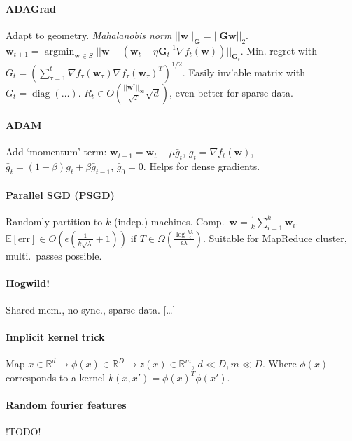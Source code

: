 \documentclass[9pt]{scrartcl}
\DeclareMathOperator{\diag}{diag}
\DeclareMathOperator{\argmin}{argmin}
\newcommand{\eps}{\epsilon}
\newcommand{\R}{\mathbb{R}}
\newcommand{\E}{\mathbb{E}}
\begin{document}
\begin{twocolumn}
\paragraph{ADAGrad}
Adapt to geometry.
\emph{Mahalanobis norm} $||\bm w||_{\bm G} = ||\bm G\bm w||_2$. \\
$\bm w_{t+1}=\argmin_{\bm w\in S}||\bm w - (\bm w_t - \eta \bm G_t^{-1}\nabla f_t(\bm w))||_{\bm G_t}$.
Min. regret with $G_t = (\sum_{\tau = 1}^{t} \nabla f_\tau(\bm w_\tau)\nabla f_\tau(\bm w_\tau)^T)^{1/2}.$
Easily inv'able matrix with $G_t = \diag(\dots).$
$R_t \in O(\frac{||\bm w^*||_\infty}{\sqrt T}\sqrt d)$, even better for sparse data.

\paragraph{ADAM}
Add `momentum' term: $\bm w_{t+1} = \bm w_t - \mu\bar g_t$, $g_t = \nabla f_t(\bm w)$, $\bar g_t = (1-\beta)g_t + \beta \bar g_{t-1}$, $\bar g_0 = 0$.
Helps for dense gradients.

\paragraph{Parallel SGD (PSGD)}
Randomly partition to $k$ (indep.) machines. Comp.\ $\bm w = \frac{1}{k}\sum_{i=1}^k \bm w_i$.
$\E[\text{err}] \in O(\eps(\frac{1}{k\sqrt\lambda}+1))$ if $T \in \Omega(\frac{\log \frac{k\lambda}{\eps}}{\eps\lambda})$.
Suitable for MapReduce cluster, multi.\ passes possible.

\paragraph{Hogwild!}
Shared mem., no sync., sparse data. [\dots]

\paragraph{Implicit kernel trick}
Map $x \in \R^d \rightarrow \phi(x) \in \R^D \rightarrow z(x) \in \R^m$, $d \ll D, m \ll D$.
Where $\phi(x)$ corresponds to a kernel $k(x,x') = \phi(x)^T\phi(x')$.

\paragraph{Random fourier features}
!TODO!

\end{twocolumn}
\end{document}
